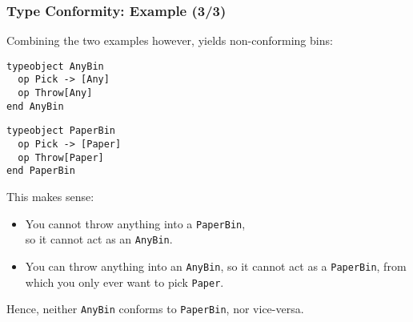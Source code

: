 \begin{frame}[fragile]

\frametitle{Type Conformity: Example (3/3)}

Combining the two examples however, yields non-conforming bins:

\begin{center}
\begin{minipage}{0.4\textwidth}
\begin{lstlisting}
typeobject AnyBin
  op Pick -> [Any]
  op Throw[Any]
end AnyBin
\end{lstlisting}
\end{minipage}\quad%
\begin{minipage}{0.4\textwidth}
\begin{lstlisting}
typeobject PaperBin
  op Pick -> [Paper]
  op Throw[Paper]
end PaperBin
\end{lstlisting}
\end{minipage}
\end{center}

This makes sense:

\begin{itemize}

\item You cannot throw anything into a \texttt{PaperBin},\\ so it
cannot act as an \texttt{AnyBin}.

\item You can throw anything into an \texttt{AnyBin}, so it cannot act
as a \texttt{PaperBin}, from which you only ever want to pick
\texttt{Paper}.

\end{itemize}

Hence, neither \texttt{AnyBin} conforms to \texttt{PaperBin}, nor
vice-versa.

\end{frame}
